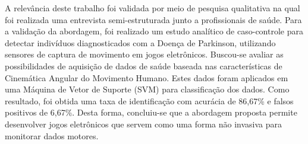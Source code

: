 A relevância deste trabalho foi validada por meio de pesquisa qualitativa na qual foi realizada uma entrevista semi-estruturada junto a profissionais de saúde. Para a validação da abordagem, foi realizado um estudo analítico de caso-controle para detectar indivíduos diagnosticados com a Doença de Parkinson, utilizando sensores de captura de movimento em jogos eletrônicos. Buscou-se avaliar as possibilidades de aquisição de dados de saúde baseada nas características de Cinemática Angular do Movimento Humano. Estes dados foram aplicados em uma Máquina de Vetor de Suporte (SVM) para classificação dos dados. Como resultado, foi obtida uma taxa de identificação com acurácia de 86,67\% e falsos positivos de 6,67\%. Desta forma, concluiu-se que a abordagem proposta permite desenvolver jogos eletrônicos que servem como uma forma não invasiva para monitorar dados motores.



